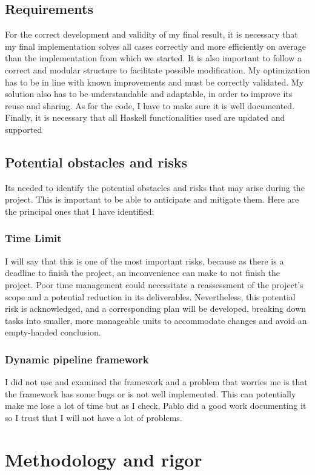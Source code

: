 \subsection{Requirements}
For the correct development and validity of my final result, it is necessary that my final implementation solves all cases correctly and more efficiently on average than the implementation from which we started.
It is also important to follow a correct and modular structure to facilitate possible modification.
My optimization has to be in line with known improvements and must be correctly validated.
My solution also has to be understandable and adaptable, in order to improve its reuse and sharing.
As for the code, I have to make sure it is well documented.
Finally, it is necessary that all Haskell functionalities used are updated and supported
\subsection{Potential obstacles and risks}
Its needed to identify the potential obstacles and risks that may arise during the project.
This is important to be able to anticipate and mitigate them.
Here are the principal ones that I have identified:
\subsubsection*{Time Limit}
I will say that this is one of the most important risks, because as there is a deadline to finish the project, an inconvenience can make to not finish the project.
Poor time management could necessitate a reassessment of the project's scope and a potential reduction in its deliverables.
Nevertheless, this potential risk is acknowledged, and a corresponding plan will be developed, breaking down tasks into smaller, more manageable units to accommodate changes and avoid an empty-handed conclusion.
\subsubsection*{Dynamic pipeline framework}
I did not use and examined the framework and a problem that worries me is that the framework has some bugs or is not well implemented.
This can potentially make me lose a lot of time but as I check, Pablo did a good work documenting it so I trust that I will not have a lot of problems.

\section{Methodology and rigor}
